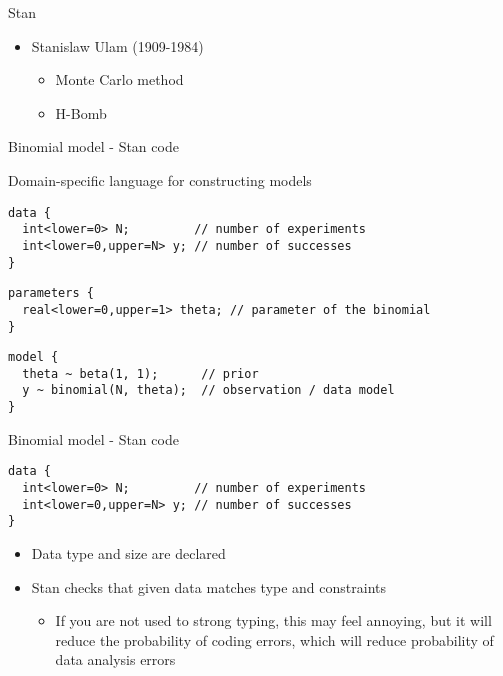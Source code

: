\documentclass[finnish,english,t]{beamer}
\begin{document}
\begin{frame}{Stan}

  \begin{itemize}
  \item Stanislaw Ulam (1909-1984)
    \begin{itemize}
    \item Monte Carlo method
    \item H-Bomb
    \end{itemize}
  \end{itemize}
  
\end{frame}

\begin{frame}[fragile]{Binomial model - Stan code}

  {Domain-specific language} for constructing models


\small
{}  

{
\begin{verbatim}
data {
  int<lower=0> N;         // number of experiments
  int<lower=0,upper=N> y; // number of successes
}
\end{verbatim}
}

{
\begin{verbatim}
parameters {
  real<lower=0,upper=1> theta; // parameter of the binomial
}
\end{verbatim}
}
  
{
\begin{verbatim}
model {
  theta ~ beta(1, 1);      // prior
  y ~ binomial(N, theta);  // observation / data model
}
\end{verbatim}
}

\end{frame} 


\begin{frame}[fragile]{Binomial model - Stan code}
  
  {\small
  \begin{verbatim}
data {
  int<lower=0> N;         // number of experiments
  int<lower=0,upper=N> y; // number of successes
}
\end{verbatim}
  }

  \begin{itemize}
  \item Data type and size are declared
  \item Stan checks that given data matches type and constraints
    \begin{itemize}
    \item<2-> If you are not used to strong typing, this may
      feel annoying, but it will reduce the probability of coding
      errors, which will reduce probability of data analysis errors
    \end{itemize}
  \end{itemize}
\end{frame}
\end{document}
